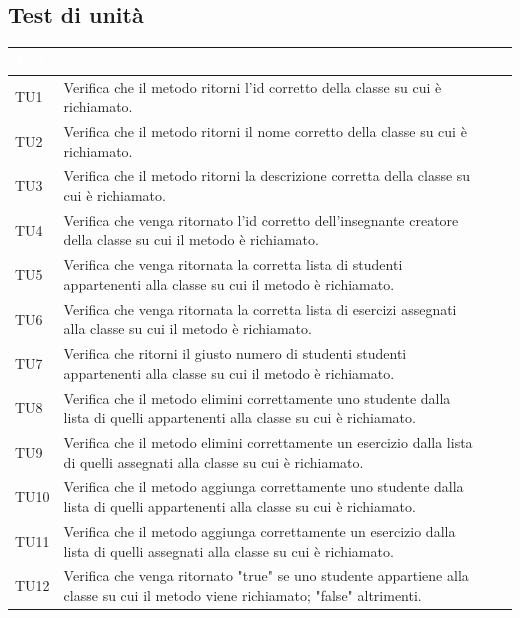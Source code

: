 \subsection{Test di unità}
\begin{longtable}{|>{\centering\arraybackslash}m{1.6cm}|>{\centering\arraybackslash}m{6.41cm}|>{\centering\arraybackslash}m{3.1cm}| c |}		
		\rowcolor{LightBlue}
		\textbf{\textcolor{white}{Test}}
		& \multicolumn{1}{|c|}{\textbf{\textcolor{white}{ Descrizione}}}\\
		\hline
		TU1 & Verifica che il metodo ritorni l'id corretto della classe su cui è richiamato. \\ \hline
		\rowcolor{LightGray}
		TU2 & Verifica che il metodo ritorni il nome corretto della classe su cui è richiamato. \\ \hline
		TU3 & Verifica che il metodo ritorni la descrizione corretta della classe su cui è richiamato.\\ \hline
		\rowcolor{LightGray}
		TU4 & Verifica che venga ritornato l'id corretto dell'insegnante creatore della classe su cui il metodo è richiamato. \\ \hline
		TU5 & Verifica che venga ritornata la corretta lista di studenti appartenenti alla classe su cui il metodo è richiamato.  \\ \hline
		\rowcolor{LightGray}
		TU6 & Verifica che venga ritornata la corretta lista di esercizi assegnati alla classe su cui il metodo è richiamato.\\ \hline
		TU7 & Verifica che ritorni il giusto numero di studenti studenti appartenenti alla classe su cui il metodo è richiamato.  \\ \hline
		\rowcolor{LightGray}
		TU8 & Verifica che il metodo elimini correttamente uno studente dalla lista di quelli appartenenti alla classe su cui è  richiamato.  \\ \hline
		TU9 & Verifica che il metodo elimini correttamente un esercizio dalla lista di quelli assegnati alla classe su cui è  richiamato.\\ \hline
		\rowcolor{LightGray}
		TU10 & Verifica che il metodo aggiunga correttamente uno studente dalla lista di quelli appartenenti alla classe su cui è  richiamato.\\ \hline
		TU11 & Verifica che il metodo aggiunga correttamente un esercizio dalla lista di quelli assegnati alla classe su cui è  richiamato. \\ \hline
		\rowcolor{LightGray}
		TU12 & Verifica che venga ritornato "true" se uno studente appartiene alla classe su cui il metodo viene richiamato; "false" altrimenti.  \\ \hline	

\end{longtable}
